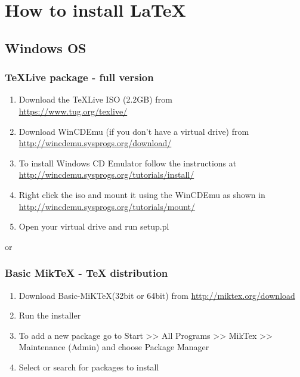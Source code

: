 \chapter{How to install \LaTeX} 

\section*{Windows OS}

\subsection*{TeXLive package - full version}
\begin{enumerate}
\item	Download the TeXLive ISO (2.2GB) from\\
\href{https://www.tug.org/texlive/}{https://www.tug.org/texlive/}
\item	Download WinCDEmu (if you don't have a virtual drive) from \\
\href{http://wincdemu.sysprogs.org/download/}{http://wincdemu.sysprogs.org/download/}
\item	To install Windows CD Emulator follow the instructions at\\
\href{http://wincdemu.sysprogs.org/tutorials/install/}{http://wincdemu.sysprogs.org/tutorials/install/}
\item	Right click the iso and mount it using the WinCDEmu as shown in \\
\href{http://wincdemu.sysprogs.org/tutorials/mount/}{http://wincdemu.sysprogs.org/tutorials/mount/}
\item	Open your virtual drive and run setup.pl
\end{enumerate}

or

\subsection*{Basic MikTeX - TeX distribution}
\begin{enumerate}
\item	Download Basic-MiK\TeX (32bit or 64bit) from \href{http://miktex.org/download}{http://miktex.org/download}
\item	Run the installer 
\item	To add a new package go to Start >> All Programs >> MikTex >> Maintenance (Admin) and choose Package Manager
\item	Select or search for packages to install
\end{enumerate}

